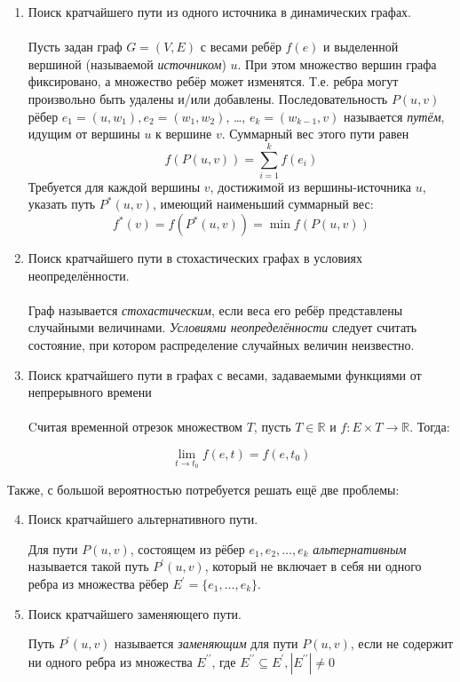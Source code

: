 \documentclass[12pt]{article}
\begin{document}
\begin{enumerate}
  \item Поиск кратчайшего пути из одного источника в динамических графах. \\ \\
  Пусть задан граф $G = (V,E)$ с весами ребёр $f(e)$ и выделенной вершиной (называемой \textit{источником}) $u$. При этом множество вершин графа фиксировано, а множество ребёр может изменятся. Т.е. ребра могут произвольно быть удалены и/или добавлены. Последовательность $P(u,v)$ рёбер $e_1=(u,w_1), e_2=(w_1,w_2)$, …, $e_k=(w_{k-1},v)$ называется \textit{путём}, идущим от вершины $u$ к вершине $v$. Суммарный вес этого пути равен
  $$ f(P(u,v)) = \sum_{i = 1}^k f(e_i) $$  
  Требуется для каждой вершины $v$, достижимой из вершины-источника $u$, указать путь $P^*(u,v)$, имеющий наименьший суммарный вес:
  $$ f^*(v) = f(P^*(u,v)) = \min f(P(u,v)) $$
  
  \item Поиск кратчайшего пути в стохастических графах в условиях неопределённости. \\ \\
  
  Граф называется \textit{стохастическим}, если веса его ребёр представлены случайными величинами. \textit{Условиями неопределённости} следует считать состояние, при котором распределение случайных величин неизвестно.
  
  \item Поиск кратчайшего пути в графах с весами, задаваемыми функциями от непрерывного времени \\ \\
  Cчитая временной отрезок множеством $T$, пусть $T \in \mathbb{R}$ и $f: E \times T \rightarrow \mathbb{R}$. Тогда:
  
  $$ \lim_{t\to t_0} f(e,t) = f(e,t_0) $$
  
\end{enumerate}

Также, с большой вероятностью потребуется решать ещё две проблемы:

\begin{enumerate}
\setcounter{enumi}{3}
  \item Поиск кратчайшего альтернативного пути.
  
  Для пути $P(u,v)$, состоящем из рёбер $e_1, e_2, …, e_k$ \textit{альтернативным} называется такой путь $P^\prime(u,v)$, который не включает в себя ни одного ребра из множества рёбер $E^\prime= \{e_1, ..., e_k\}$.
  
  \item Поиск кратчайшего заменяющего пути.
  
  Путь $P^\prime(u,v)$ называется \textit{заменяющим} для пути $P(u,v)$, если не содержит ни одного ребра из множества $E^{\prime\prime}$, где $E^{\prime\prime} \subseteq E^\prime, |E^{\prime\prime}| \neq 0$
  
\end{enumerate}
\end{document}
